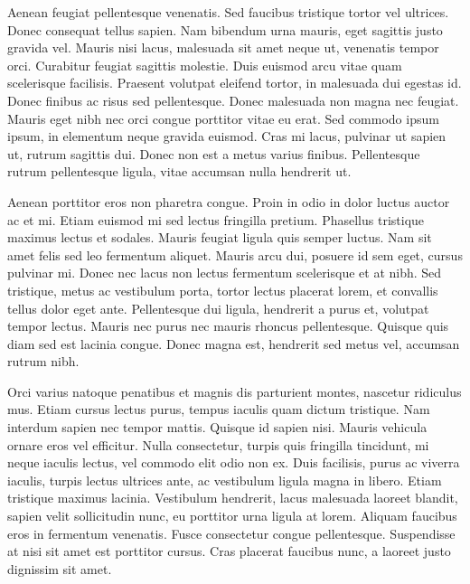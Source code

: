 \documentclass[
	letterpaper, %
	10pt, %
	unnumberedsections, %
	twoside, %
]{LTJournalArticle}
\begin{document}
Aenean feugiat pellentesque venenatis. Sed faucibus tristique tortor vel ultrices. Donec consequat tellus sapien. Nam bibendum urna mauris, eget sagittis justo gravida vel. Mauris nisi lacus, malesuada sit amet neque ut, venenatis tempor orci. Curabitur feugiat sagittis molestie. Duis euismod arcu vitae quam scelerisque facilisis. Praesent volutpat eleifend tortor, in malesuada dui egestas id. Donec finibus ac risus sed pellentesque. Donec malesuada non magna nec feugiat. Mauris eget nibh nec orci congue porttitor vitae eu erat. Sed commodo ipsum ipsum, in elementum neque gravida euismod. Cras mi lacus, pulvinar ut sapien ut, rutrum sagittis dui. Donec non est a metus varius finibus. Pellentesque rutrum pellentesque ligula, vitae accumsan nulla hendrerit ut.

Aenean porttitor eros non pharetra congue. Proin in odio in dolor luctus auctor ac et mi. Etiam euismod mi sed lectus fringilla pretium. Phasellus tristique maximus lectus et sodales. Mauris feugiat ligula quis semper luctus. Nam sit amet felis sed leo fermentum aliquet. Mauris arcu dui, posuere id sem eget, cursus pulvinar mi. Donec nec lacus non lectus fermentum scelerisque et at nibh. Sed tristique, metus ac vestibulum porta, tortor lectus placerat lorem, et convallis tellus dolor eget ante. Pellentesque dui ligula, hendrerit a purus et, volutpat tempor lectus. Mauris nec purus nec mauris rhoncus pellentesque. Quisque quis diam sed est lacinia congue. Donec magna est, hendrerit sed metus vel, accumsan rutrum nibh.


Orci varius natoque penatibus et magnis dis parturient montes, nascetur ridiculus mus. Etiam cursus lectus purus, tempus iaculis quam dictum tristique. Nam interdum sapien nec tempor mattis. Quisque id sapien nisi. Mauris vehicula ornare eros vel efficitur. Nulla consectetur, turpis quis fringilla tincidunt, mi neque iaculis lectus, vel commodo elit odio non ex. Duis facilisis, purus ac viverra iaculis, turpis lectus ultrices ante, ac vestibulum ligula magna in libero. Etiam tristique maximus lacinia. Vestibulum hendrerit, lacus malesuada laoreet blandit, sapien velit sollicitudin nunc, eu porttitor urna ligula at lorem. Aliquam faucibus eros in fermentum venenatis. Fusce consectetur congue pellentesque. Suspendisse at nisi sit amet est porttitor cursus. Cras placerat faucibus nunc, a laoreet justo dignissim sit amet.
\end{document}

